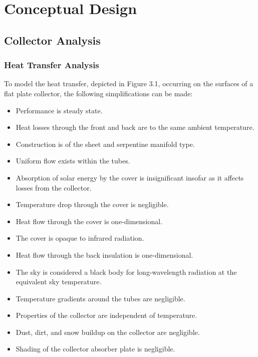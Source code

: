 \chapter{Conceptual Design}

\section{Collector Analysis}

\subsection{Heat Transfer Analysis}

To model the heat transfer, depicted in Figure 3.1, occurring on the surfaces of a flat plate collector, the following simplifications can be made:

\medskip
\begin{itemize}[itemsep=3mm, parsep=-1mm]
    \item Performance is steady state. 
    \item Heat losses through the front and back are to the same ambient temperature.
    \item Construction is of the sheet and serpentine manifold type.
    \item Uniform flow exists within the tubes.
    \item Absorption of solar energy by the cover is insignificant insofar as it affects losses from the collector. 
    \item Temperature drop through the cover is negligible. 
    \item Heat flow through the cover is one-dimensional.
    \item The cover is opaque to infrared radiation. 
    \item Heat flow through the back insulation is one-dimensional. 
    \item The sky is considered a black body for long-wavelength radiation at the equivalent sky temperature.
    \item Temperature gradients around the tubes are negligible. 
    \item Properties of the collector are independent of temperature. 
    \item Dust, dirt, and snow buildup on the collector are negligible. 
    \item Shading of the collector absorber plate is negligible.
\end{itemize}

